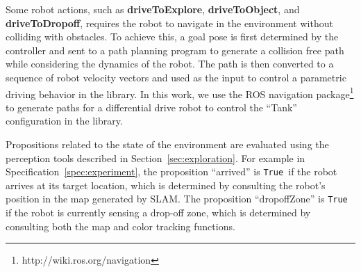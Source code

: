 \documentclass[conference]{IEEEtran}
\newcommand{\lt}{{\tt True }}
\begin{document}
Some robot actions, such as \textbf{driveToExplore}, \textbf{driveToObject}, and \textbf{driveToDropoff}, requires the robot to navigate in the environment without colliding with obstacles.
To achieve this, a goal pose is first determined by the controller and sent to a path planning program to generate a collision free path while considering the dynamics of the robot.
The path is then converted to a sequence of robot velocity vectors and used as the input to control a parametric driving behavior in the library.
In this work, we use the ROS navigation package\footnote{http://wiki.ros.org/navigation} to generate paths for a differential drive robot to control the ``Tank'' configuration in the library.

Propositions related to the state of the environment are evaluated using the perception tools described in Section~\ref{sec:exploration}. For example in Specification~\ref{spec:experiment}, the proposition ``arrived'' is \lt if the robot arrives at its target location, which is determined by consulting the robot's position in the map generated by SLAM. The proposition ``dropoffZone'' is \lt if the robot is currently sensing a drop-off zone, which is determined by consulting both the map and color tracking functions.
\end{document}
